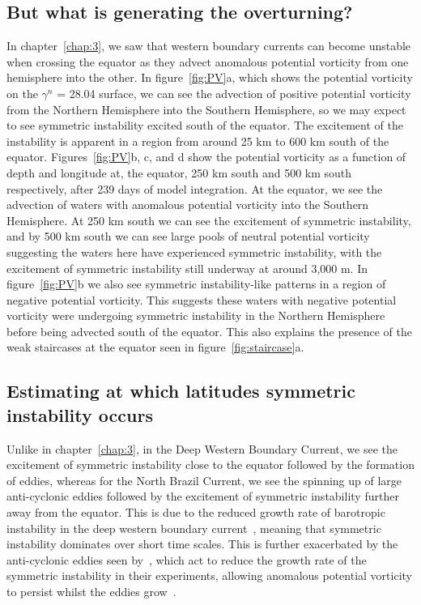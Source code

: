 \subsection{But what is generating the overturning?}
In chapter~\ref{chap:3}, we saw that western boundary currents can become unstable when crossing the equator as they advect anomalous potential vorticity from one hemisphere into the other. In figure~\ref{fig:PV}a, which shows the potential vorticity on the $\gamma^n$ = 28.04 surface, we can see the advection of positive potential vorticity from the Northern Hemisphere into the Southern Hemisphere, so we may expect to see symmetric instability excited south of the equator. The excitement of the instability is apparent in a region from around 25 km to 600 km south of the equator. Figures~\ref{fig:PV}b, c, and d show the potential vorticity as a function of depth and longitude at, the equator, 250 km south and 500 km south respectively, after 239 days of model integration. At the equator, we see the advection of waters with anomalous potential vorticity into the Southern Hemisphere. At 250 km south we can see the excitement of symmetric instability, and by 500 km south we can see large pools of neutral potential vorticity suggesting the waters here have experienced symmetric instability, with the excitement of symmetric instability still underway at around 3,000 m. In figure~\ref{fig:PV}b we also see symmetric instability-like patterns in a region of negative potential vorticity. This suggests these waters with negative potential vorticity were undergoing symmetric instability in the Northern Hemisphere before being advected south of the equator. This also explains the presence of the weak staircases at the equator seen in figure~\ref{fig:staircase}a.

\subsection{Estimating at which latitudes symmetric instability occurs}
\label{sec:relation2nbc}
Unlike in chapter~\ref{chap:3}, in the Deep Western Boundary Current, we see the excitement of symmetric instability close to the equator followed by the formation of eddies, whereas for the North Brazil Current, we see the spinning up of large anti-cyclonic eddies followed by the excitement of symmetric instability further away from the equator. This is due to the reduced growth rate of barotropic instability in the deep western boundary current~\citep{Edwards1998II}, meaning that symmetric instability dominates over short time scales. This is further exacerbated by the anti-cyclonic eddies seen by~\citet{Goldsworth2021}, which act to reduce the growth rate of the symmetric instability in their experiments, allowing anomalous potential vorticity to persist whilst the eddies grow~\citep{Buckingham2021}. 

